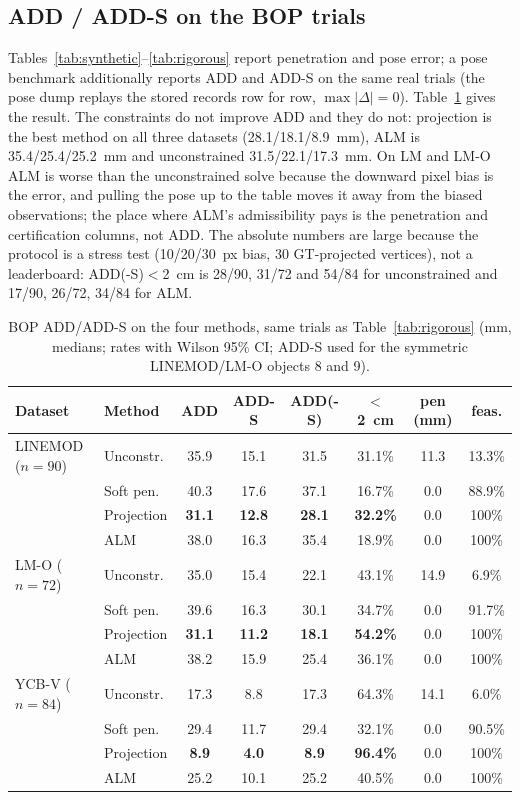 \subsection{ADD / ADD-S on the BOP trials}\label{sec:add}
Tables~\ref{tab:synthetic}--\ref{tab:rigorous} report penetration and pose error; a pose benchmark additionally reports ADD and ADD-S on the same real trials (the pose dump replays the stored records row for row, $\max|\Delta|=0$). Table~\ref{tab:add} gives the result. The constraints do not improve ADD and they do not: projection is the best method on all three datasets (28.1/18.1/8.9~mm), ALM is 35.4/25.4/25.2~mm and unconstrained 31.5/22.1/17.3~mm. On LM and LM-O ALM is worse than the unconstrained solve because the downward pixel bias is the error, and pulling the pose up to the table moves it away from the biased observations; the place where ALM's admissibility pays is the penetration and certification columns, not ADD. The absolute numbers are large because the protocol is a stress test (10/20/30~px bias, 30 GT-projected vertices), not a leaderboard: ADD(-S)$<$2~cm is 28/90, 31/72 and 54/84 for unconstrained and 17/90, 26/72, 34/84 for ALM.

\begin{table}[t]
\centering
\caption{BOP ADD/ADD-S on the four methods, same trials as Table~\ref{tab:rigorous} (mm, medians; rates with Wilson 95\% CI; ADD-S used for the symmetric LINEMOD/LM-O objects 8 and 9).}
\label{tab:add}
\scriptsize
\setlength{\tabcolsep}{4pt}
\begin{tabular}{@{}llcccccc@{}}
\toprule
Dataset & Method & ADD & ADD-S & ADD(-S) & $<$2~cm & pen (mm) & feas. \\
\midrule
LINEMOD ($n{=}90$) & Unconstr. & 35.9 & 15.1 & 31.5 & 31.1\% & 11.3 & 13.3\% \\
 & Soft pen. & 40.3 & 17.6 & 37.1 & 16.7\% & 0.0 & 88.9\% \\
 & Projection & \textbf{31.1} & \textbf{12.8} & \textbf{28.1} & \textbf{32.2\%} & 0.0 & 100\% \\
 & ALM & 38.0 & 16.3 & 35.4 & 18.9\% & 0.0 & 100\% \\
LM-O ($n{=}72$) & Unconstr. & 35.0 & 15.4 & 22.1 & 43.1\% & 14.9 & 6.9\% \\
 & Soft pen. & 39.6 & 16.3 & 30.1 & 34.7\% & 0.0 & 91.7\% \\
 & Projection & \textbf{31.1} & \textbf{11.2} & \textbf{18.1} & \textbf{54.2\%} & 0.0 & 100\% \\
 & ALM & 38.2 & 15.9 & 25.4 & 36.1\% & 0.0 & 100\% \\
YCB-V ($n{=}84$) & Unconstr. & 17.3 & 8.8 & 17.3 & 64.3\% & 14.1 & 6.0\% \\
 & Soft pen. & 29.4 & 11.7 & 29.4 & 32.1\% & 0.0 & 90.5\% \\
 & Projection & \textbf{8.9} & \textbf{4.0} & \textbf{8.9} & \textbf{96.4\%} & 0.0 & 100\% \\
 & ALM & 25.2 & 10.1 & 25.2 & 40.5\% & 0.0 & 100\% \\
\bottomrule
\end{tabular}
\end{table}
